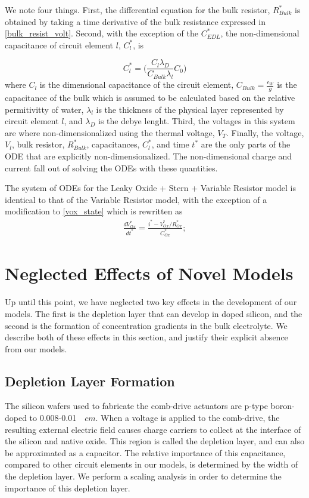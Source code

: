 We note four things. First, the differential equation for the bulk resistor, $R_{Bulk}^*$ is obtained by taking a time derivative of the bulk resistance expressed in \ref{bulk_resist_volt}. Second, with the exception of the $C_{EDL}^*$, the non-dimensional capacitance of circuit element $l$, $C_l^*$, is 

\begin{equation}
    C_l^* = \bigg(\frac{C_{l} \lambda_{D}}{C_{Bulk} \lambda_{l}}C_0\bigg)
\end{equation}
where $C_{l}$ is the dimensional capacitance of the circuit element, $C_{Bulk}=\frac{\epsilon_W}{g}$ is the capacitance of the bulk which is assumed to be calculated based on the relative permitivitty of water, $\lambda_{l}$ is the thickness of the physical layer represented by circuit element $l$, and $\lambda_{D}$ is the debye lenght. Third, the voltages in this system are where non-dimensionalized using the thermal voltage, $V_T$. Finally, the voltage, $V_{l}$, bulk resistor, $R_{Bulk}^*$, capacitances, $C_l^*$, and time $t^*$ are the only parts of the ODE that are explicitly non-dimensionalized. The non-dimensional charge and current fall out of solving the ODEs with these quantities.

The system of ODEs for the Leaky Oxide + Stern + Variable Resistor model is identical to that of the Variable Resistor model, with the exception of a modification to \ref{vox_state} which is rewritten as
\begin{align} \label{vox_state_leakoxstern}
\frac{dV^*_{Ox}}{dt^*} = \frac{i^* - V^*_{Ox}/R^*_{Ox}}{C^*_{Ox}};
\end{align}

\section{Neglected Effects of Novel Models}
Up until this point, we have neglected two key effects in the development of our models. The first is the depletion layer that can develop in doped silicon, and the second is the formation of concentration gradients in the bulk electrolyte. We describe both of these effects in this section, and justify their explicit absence from our models. 

\subsection{Depletion Layer Formation}
The silicon wafers used to fabricate the comb-drive actuators are p-type boron-doped to 0.008-0.01 \textOmega $\textrm{ }cm$. When a voltage is applied to the comb-drive, the resulting external electric field causes charge carriers to collect at the interface of the silicon and native oxide. This region is called the depletion layer, and can also be approximated as a capacitor. The relative importance of this capacitance, compared to other circuit elements in our models, is determined by the width of the depletion layer. We perform a scaling analysis in order to determine the importance of this depletion layer.

